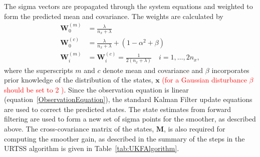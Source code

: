 \documentclass[review,authoryear,3p]{elsarticle}
\newcommand{\dean}[1]{\textcolor{red}{#1}}
\newcommand{\parham}[1]{\textcolor{blue}{#1}}
\begin{document}
The sigma vectors are propagated through the system equations and weighted to form the predicted mean and covariance. The weights are calculated by 
\begin{align}
	\mathbf W_0^{(m)}&=\frac{\lambda}{ n_x+\lambda} \\
	\mathbf W_0^{(c)}&=\frac{\lambda}{ n_x+\lambda}+(1-\alpha^2+\beta) \\
	\mathbf W_i^{(m)}&=\mathbf W_i^{(c)}=\frac{1}{2( n_x+\lambda)} \quad i=1, \dots, 2n_x, 
\end{align}
where the superscripts $m$ and $c$ denote mean and covariance and $\beta$ incorporates prior knowledge of the distribution of the states, $\mathbf{x}$ \dean{(for a Gaussian disturbance $\beta$ should be set to 2 \parham{\citep{Haykin2001}})}. Since the observation equation is linear (equation~\ref{ObservationEquation}), the standard Kalman Filter update equations are used to correct the predicted states. The state estimates from forward filtering are used to form a new set of sigma points for the smoother, as described above. The cross-covariance matrix of the states, $\mathbf M$, is also required for computing the smoother gain, as described in the summary of the steps in the URTSS algorithm is given in Table~\ref{tab:UKFAlgorithm}.
\end{document}
